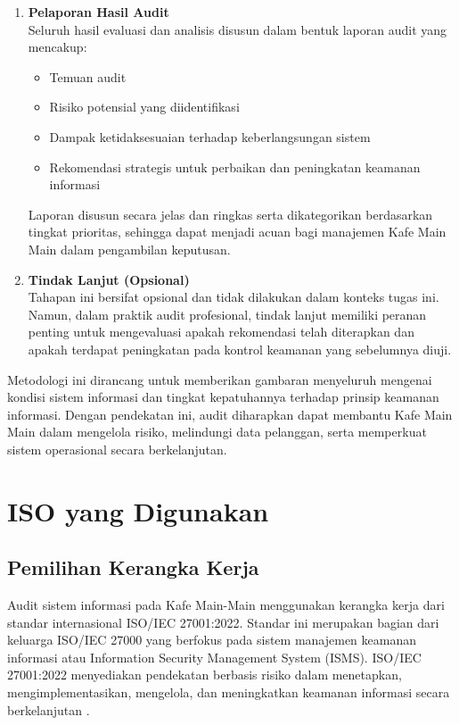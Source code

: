 \documentclass[12pt, a4paper]{report}
\begin{document}
\begin{enumerate}
    \item \textbf{Pelaporan Hasil Audit} \\
    Seluruh hasil evaluasi dan analisis disusun dalam bentuk laporan audit yang mencakup:
    \begin{itemize}
        \item Temuan audit
        \item Risiko potensial yang diidentifikasi
        \item Dampak ketidaksesuaian terhadap keberlangsungan sistem
        \item Rekomendasi strategis untuk perbaikan dan peningkatan keamanan informasi
    \end{itemize}
    Laporan disusun secara jelas dan ringkas serta dikategorikan berdasarkan tingkat prioritas, sehingga dapat menjadi acuan bagi manajemen Kafe Main Main dalam pengambilan keputusan.

    \item \textbf{Tindak Lanjut (Opsional)} \\
    Tahapan ini bersifat opsional dan tidak dilakukan dalam konteks tugas ini. Namun, dalam praktik audit profesional, tindak lanjut memiliki peranan penting untuk mengevaluasi apakah rekomendasi telah diterapkan dan apakah terdapat peningkatan pada kontrol keamanan yang sebelumnya diuji.
\end{enumerate}

Metodologi ini dirancang untuk memberikan gambaran menyeluruh mengenai kondisi sistem informasi dan tingkat kepatuhannya terhadap prinsip keamanan informasi. Dengan pendekatan ini, audit diharapkan dapat membantu Kafe Main Main dalam mengelola risiko, melindungi data pelanggan, serta memperkuat sistem operasional secara berkelanjutan.

\chapter{ISO yang Digunakan}
\label{bab:domain}

\section{Pemilihan Kerangka Kerja}

Audit sistem informasi pada Kafe Main-Main menggunakan kerangka kerja dari standar internasional ISO/IEC 27001:2022. Standar ini merupakan bagian dari keluarga ISO/IEC 27000 yang berfokus pada sistem manajemen keamanan informasi atau Information Security Management System (ISMS). ISO/IEC 27001:2022 menyediakan pendekatan berbasis risiko dalam menetapkan, mengimplementasikan, mengelola, dan meningkatkan keamanan informasi secara berkelanjutan \citep{iso27001}.
\end{document}
